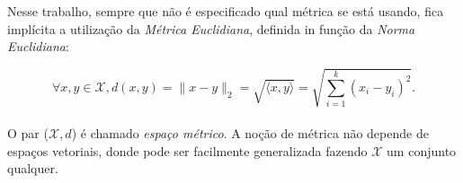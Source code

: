 \documentclass[a4paper,12pt]{article}
\begin{document}
Nesse trabalho, sempre que não é especificado qual métrica se está usando, fica implícita a utilização da \textit{Métrica Euclidiana}, definida in função da \textit{Norma Euclidiana}:

\begin{equation}\tag{Norma Euclidiana}
\forall x, y \in \mathcal{X}, d(x,y) = \lVert x-y \rVert_2 = \sqrt{\langle x, y\rangle} = \sqrt{\sum_{i = 1}^{k} (x_i-y_i)^2}.
\label{eq:normaEuclidiana}
\end{equation}
\\

O par ($\mathcal{X}, d$) é chamado \textit{espaço métrico}. A noção de métrica não depende de espaços vetoriais, donde pode ser facilmente generalizada fazendo $\mathcal{X}$ um conjunto qualquer.
\end{document}
